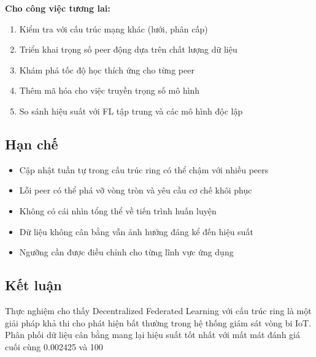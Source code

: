 \textbf{Cho công việc tương lai:}
\begin{enumerate}
    \item Kiểm tra với cấu trúc mạng khác (lưới, phân cấp)
    \item Triển khai trọng số peer động dựa trên chất lượng dữ liệu
    \item Khám phá tốc độ học thích ứng cho từng peer
    \item Thêm mã hóa cho việc truyền trọng số mô hình
    \item So sánh hiệu suất với FL tập trung và các mô hình độc lập
\end{enumerate}

\subsection{Hạn chế}

\begin{itemize}
    \item Cập nhật tuần tự trong cấu trúc ring có thể chậm với nhiều peers
    \item Lỗi peer có thể phá vỡ vòng tròn và yêu cầu cơ chế khôi phục
    \item Không có cái nhìn tổng thể về tiến trình huấn luyện
    \item Dữ liệu không cân bằng vẫn ảnh hưởng đáng kể đến hiệu suất
    \item Ngưỡng cần được điều chỉnh cho từng lĩnh vực ứng dụng
\end{itemize}

\subsection{Kết luận}

Thực nghiệm cho thấy Decentralized Federated Learning với cấu trúc ring là một giải pháp khả thi cho phát hiện bất thường trong hệ thống giám sát vòng bi IoT. Phân phối dữ liệu cân bằng mang lại hiệu suất tốt nhất với mất mát đánh giá cuối cùng 0.002425 và 100%
